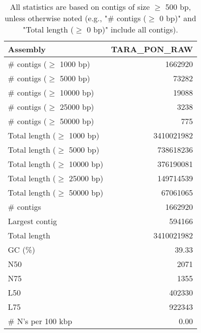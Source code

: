 \documentclass[12pt,a4paper]{article}
\begin{document}
\begin{table}[ht]
\begin{center}
\caption{All statistics are based on contigs of size $\geq$ 500 bp, unless otherwise noted (e.g., "\# contigs ($\geq$ 0 bp)" and "Total length ($\geq$ 0 bp)" include all contigs).}
\begin{tabular}{|l*{1}{|r}|}
\hline
Assembly & TARA\_PON\_RAW \\ \hline
\# contigs ($\geq$ 1000 bp) & 1662920 \\ \hline
\# contigs ($\geq$ 5000 bp) & 73282 \\ \hline
\# contigs ($\geq$ 10000 bp) & 19088 \\ \hline
\# contigs ($\geq$ 25000 bp) & 3238 \\ \hline
\# contigs ($\geq$ 50000 bp) & 775 \\ \hline
Total length ($\geq$ 1000 bp) & 3410021982 \\ \hline
Total length ($\geq$ 5000 bp) & 738618236 \\ \hline
Total length ($\geq$ 10000 bp) & 376190081 \\ \hline
Total length ($\geq$ 25000 bp) & 149714539 \\ \hline
Total length ($\geq$ 50000 bp) & 67061065 \\ \hline
\# contigs & 1662920 \\ \hline
Largest contig & 594166 \\ \hline
Total length & 3410021982 \\ \hline
GC (\%) & 39.33 \\ \hline
N50 & 2071 \\ \hline
N75 & 1355 \\ \hline
L50 & 402330 \\ \hline
L75 & 922343 \\ \hline
\# N's per 100 kbp & 0.00 \\ \hline
\end{tabular}
\end{center}
\end{table}
\end{document}
